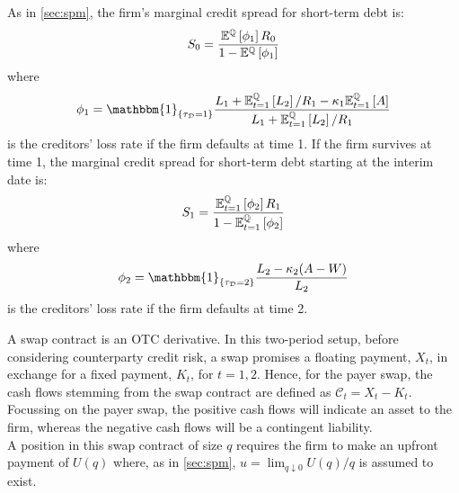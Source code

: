 \documentclass[main.tex]{subfiles}
\begin{document}
        As in \cref{sec:spm}, the firm's marginal credit spread for short-term debt is:
        \begin{equation}
            S_0 =
            \frac{
                \mathbb{E}^{\mathbb{Q}}\left[\phi_1\right]R_0
            }{
                1 - \mathbb{E}^{\mathbb{Q}}\left[\phi_1\right] 
            }
        \end{equation}
        where
        \begin{equation}
        \phi_1 = \mathbbm{1}_{\{\tau_{\mathcal{D}}=1\}}
        \frac{L_{1}+\mathbb{E}_{t=1}^{\rnmeasure}\left[L_{2}\right]/R_1 - \kappa_{1}\mathbb{E}_{t=1}^{\rnmeasure}\left[A\right]}
        {L_{1} + \mathbb{E}_{t=1}^{\rnmeasure}\left[L_{2}\right]/R_1}
        \end{equation}
        is the creditors' loss rate if the firm defaults at time 1. If the firm survives at time 1, the marginal credit spread for short-term debt starting at the interim date is:
        \begin{equation}
            S_1 =
            \frac{
                \mathbb{E}_{t=1}^{\mathbb{Q}}\left[\phi_2\right]R_1
            }{
                1 - \mathbb{E}_{t=1}^{\mathbb{Q}}\left[\phi_2\right] 
            }
        \end{equation}
        where
        \begin{equation}
        \phi_2 = \mathbbm{1}_{\{\tau_{\mathcal{D}}=2\}}
        \frac{L_{2}-\kappa_{2}(A-W)}
        {L_{2}}
        \end{equation}
        is the creditors' loss rate if the firm defaults at time 2.

        A swap contract is an OTC derivative.
        In this two-period setup, before considering counterparty credit risk, a swap promises a floating payment, $X_t$, in exchange for a fixed payment, $K_t$, for $t = 1,2$.
        Hence, for the payer swap, the cash flows stemming from the swap contract are defined as $\mathcal{C}_t = X_t - K_t$.
        Focussing on the payer swap, the positive cash flows will indicate an asset to the firm, whereas the negative cash flows will be a contingent liability.
        \\
        A position in this swap contract of size $q$ requires the firm to make an upfront payment of $U(q)$ where, as in \cref{sec:spm}, $u = \lim_{q \downarrow 0} U(q)/q$ is assumed to exist.
\end{document}
